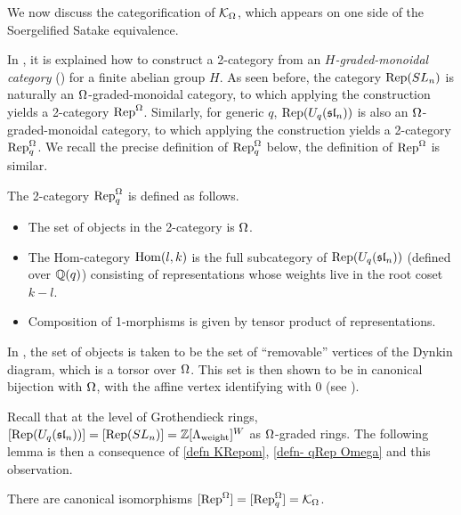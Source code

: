 We now discuss the categorification of $\mathcal{K}_{\Omega}$, which appears on one side of the Soergelified Satake equivalence.

In \cite[Section 4.2]{EQuantumI}, it is explained how to construct a 2-category from an \emph{$H$-graded-monoidal category} (\cite[Definition 4.5]{EQuantumI}) for a finite abelian group $H$. 
As seen before, the category $\operatorname{Rep}(SL_n)$ is naturally an $\Omega$-graded-monoidal category, to which applying the construction yields a 2-category $\operatorname{Rep}^{\Omega}$.
Similarly, for generic $q$, $\operatorname{Rep}(U_q(\mathfrak{sl}_n))$ is also an $\Omega$-graded-monoidal category, to which applying the construction yields a 2-category $\operatorname{Rep}_q^{\Omega}$. 
We recall the precise definition of $\operatorname{Rep}_q^{\Omega}$ below, the definition of $\operatorname{Rep}^{\Omega}$ is similar.

\begin{definition}\label{defn- qRep Omega}
    The 2-category $\operatorname{Rep}_q^{\Omega}$ is defined as follows.
    \begin{itemize}
        \item The set of objects in the 2-category is $\Omega$. 
        \item The Hom-category $\operatorname{Hom}(l,k)$ is the full subcategory %
        of $\operatorname{Rep}(U_q(\mathfrak{sl}_n))$ (defined over $\mathbb{Q}(q)$) consisting of representations whose weights live in the root coset $k-l$.
        \item Composition of 1-morphisms is given by tensor product of representations.
    \end{itemize}
\end{definition}

\begin{remark}
    In \cite{EQuantumI}, the set of objects is taken to be the set of ``removable'' vertices of the Dynkin diagram, which is a torsor over $\Omega$. This set is then shown to be in canonical bijection with $\Omega$, with the affine vertex identifying with $0$ (see \cite[Claim 4.13]{EQuantumI}).
\end{remark}

Recall that at the level of Grothendieck rings, $[\operatorname{Rep}(U_q(\mathfrak{sl}_n))]=[\operatorname{Rep}(SL_n)]=\mathbb{Z}[\Lambda_{\operatorname{weight}}]^W$ as $\Omega$-graded rings. The following lemma is then a consequence of \cref{defn KRepom}, \cref{defn- qRep Omega} and this observation.

\begin{lemma}\label{lemma decategorification of Rep-omega}
    There are canonical isomorphisms $[\operatorname{Rep}^{\Omega} ]=[\operatorname{Rep}_q^{\Omega}]=\mathcal{K}_{\Omega}$.
\end{lemma}

